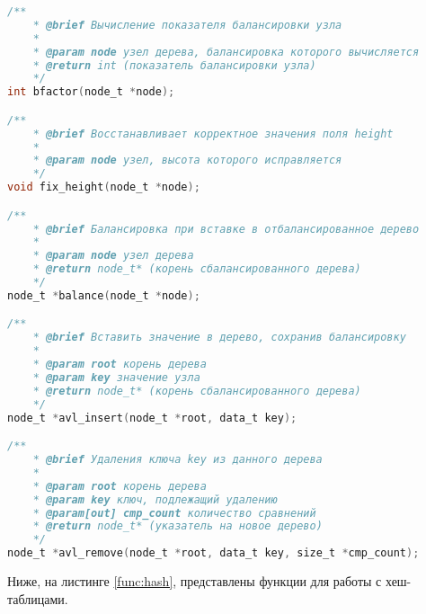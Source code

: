 \begin{lstlisting}[language=C,caption=Функции для работы с деревьями,label=func:trees]
/**
    * @brief Вычисление показателя балансировки узла
    * 
    * @param node узел дерева, балансировка которого вычисляется
    * @return int (показатель балансировки узла)
    */
int bfactor(node_t *node);

/**
    * @brief Восстанавливает корректное значения поля height
    * 
    * @param node узел, высота которого исправляется
    */
void fix_height(node_t *node);

/**
    * @brief Балансировка при вставке в отбалансированное дерево
    * 
    * @param node узел дерева
    * @return node_t* (корень сбалансированного дерева)
    */
node_t *balance(node_t *node);

/**
    * @brief Вставить значение в дерево, сохранив балансировку
    * 
    * @param root корень дерева
    * @param key значение узла
    * @return node_t* (корень сбалансированного дерева)
    */
node_t *avl_insert(node_t *root, data_t key);

/**
    * @brief Удаления ключа key из данного дерева
    * 
    * @param root корень дерева
    * @param key ключ, подлежащий удалению
    * @param[out] cmp_count количество сравнений
    * @return node_t* (указатель на новое дерево)
    */
node_t *avl_remove(node_t *root, data_t key, size_t *cmp_count);

\end{lstlisting}

Ниже, на листинге \ref{func:hash}, представлены функции для работы с хеш-таблицами.

